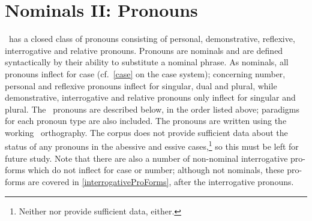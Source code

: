


\chapter{Nominals II: Pronouns}\label{pronouns}
\PS\ has a closed class of pronouns consisting of personal, demonstrative, reflexive, interrogative and relative pronouns. Pronouns are nominals and are defined syntactically by their ability to substitute a nominal phrase. 
As nominals, all pronouns inflect for case (cf.~\SEC\ref{case} on the case system); concerning number, personal and reflexive pronouns inflect for singular, dual and plural, while demonstrative, interrogative and relative pronouns only inflect for singular and plural. 
The \PS\ pronouns are described below, in the order listed above; paradigms for each pronoun type are also included. The pronouns are written using the working \PS\ orthography. The corpus does not provide sufficient data about the status of any pronouns in the abessive and essive cases,\footnote{Neither \citet{Lagercrantz1926} nor \citet{Lehtiranta1992} provide sufficient data, either.} 
so this must be left for future study. 
Note that there are also a number of non-nominal interrogative pro-forms which do not inflect for case or number; although not nominals, these pro-forms are covered in \SEC\ref{interrogativeProForms}, after the interrogative pronouns. 


